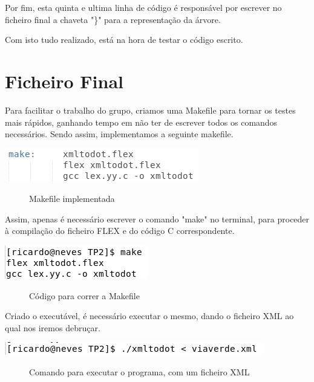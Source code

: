 \documentclass[a4paper]{article}
\begin{document}
Por fim, esta quinta e ultima linha de código é responsável por escrever no ficheiro final a chaveta "\}" para a representação da árvore.

Com isto tudo realizado, está na hora de testar o código escrito.

\section{Ficheiro Final}
\label{sec:ffinal}

Para facilitar o trabalho do grupo, criamos uma Makefile para tornar os testes mais rápidos, ganhando tempo em não ter de escrever todos os comandos necessários. Sendo assim, implementamos a seguinte makefile.

\begin{center}
	\includegraphics{makefile}
	\begin{figure}[!h]
	\caption{Makefile implementada}
	\end{figure}
\end{center}

Assim, apenas é necessário escrever o comando "make" no terminal, para proceder à compilação do ficheiro FLEX e do código C correspondente.

\begin{center}
	\includegraphics{makefileTerminal}
	\begin{figure}[!h]
	\caption{Código para correr a Makefile}
	\end{figure}
\end{center}

Criado o executável, é necessário executar o mesmo, dando o ficheiro XML ao qual nos iremos debruçar.

\vspace{75px}
\begin{center}
	\includegraphics[scale=0.8]{xmltodotViaVerde}
	\begin{figure}[!h]
	\caption{Comando para executar o programa, com um ficheiro XML}
	\end{figure}
\end{center}
\end{document}

